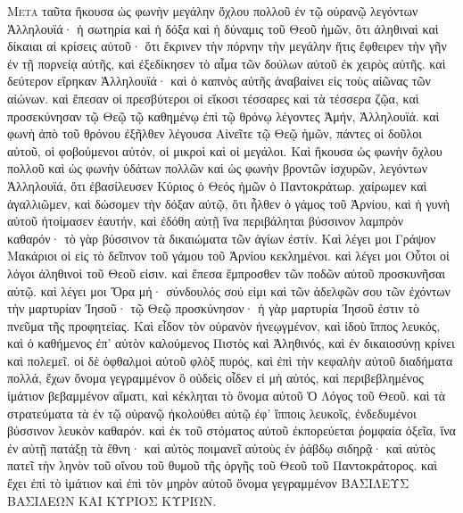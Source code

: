 \begin{pages}
    \begin{Rightside}
        \beginnumbering
		\renewcommand{\LettrineFontHook}{\PHtitl}
		\lettrine[lines=3]{Μ}{ετὰ} ταῦτα ἤκουσα ὡς φωνὴν μεγάλην ὄχλου πολλοῦ ἐν τῷ οὐρανῷ λεγόντων 	Ἁλληλουϊά· ἡ σωτηρία καὶ ἡ δόξα καὶ ἡ δύναμις τοῦ Θεοῦ ἡμῶν, ὅτι ἀληθιναὶ καὶ δίκαιαι αἱ κρίσεις αὐτοῦ· ὅτι ἔκρινεν τὴν πόρνην τὴν μεγάλην ἥτις ἔφθειρεν τὴν γῆν ἐν τῇ πορνείᾳ αὐτῆς, καὶ ἐξεδίκησεν τὸ αἷμα τῶν δούλων αὐτοῦ ἐκ χειρὸς αὐτῆς.
		\pend
		\pstart
		καὶ δεύτερον εἴρηκαν Ἁλληλουϊά· καὶ ὁ καπνὸς αὐτῆς ἀναβαίνει εἰς τοὺς αἰῶνας τῶν αἰώνων. καὶ ἔπεσαν οἱ πρεσβύτεροι οἱ εἴκοσι τέσσαρες καὶ τὰ τέσσερα ζῷα, καὶ προσεκύνησαν τῷ Θεῷ τῷ καθημένῳ ἐπὶ τῷ θρόνῳ λέγοντες Ἀμήν, Ἁλληλουϊά. καὶ φωνὴ ἀπὸ τοῦ θρόνου ἐξῆλθεν λέγουσα 	Αἰνεῖτε τῷ Θεῷ ἡμῶν, πάντες οἱ δοῦλοι αὐτοῦ, οἱ φοβούμενοι αὐτόν, οἱ μικροὶ καὶ οἱ μεγάλοι.
		\pend
		\pstart
		Καὶ ἤκουσα ὡς φωνὴν ὄχλου πολλοῦ καὶ ὡς φωνὴν ὑδάτων πολλῶν καὶ ὡς φωνὴν βροντῶν ἰσχυρῶν, λεγόντων Ἁλληλουϊά, ὅτι ἐβασίλευσεν Κύριος ὁ Θεός ἡμῶν ὁ Παντοκράτωρ. χαίρωμεν καὶ ἀγαλλιῶμεν, καὶ δώσομεν τὴν δόξαν αὐτῷ, ὅτι ἦλθεν ὁ γάμος τοῦ Ἀρνίου, καὶ ἡ γυνὴ 	αὐτοῦ ἡτοίμασεν ἑαυτήν, καὶ ἐδόθη αὐτῇ ἵνα περιβάληται βύσσινον λαμπρὸν καθαρόν· τὸ 	γὰρ βύσσινον τὰ δικαιώματα τῶν ἁγίων ἐστίν.
		\pend
		\pstart
		Καὶ λέγει μοι Γράψον Μακάριοι οἱ εἰς τὸ δεῖπνον τοῦ γάμου τοῦ Ἀρνίου κεκλημένοι. καὶ λέγει μοι Οὗτοι οἱ λόγοι ἀληθινοὶ τοῦ Θεοῦ εἰσιν. καὶ ἔπεσα ἔμπροσθεν τῶν ποδῶν αὐτοῦ προσκυνῆσαι αὐτῷ. καὶ λέγει μοι Ὅρα μή· σύνδουλός σού εἰμι καὶ τῶν ἀδελφῶν σου τῶν ἐχόντων τὴν μαρτυρίαν Ἰησοῦ· τῷ Θεῷ προσκύνησον· ἡ γὰρ μαρτυρία Ἰησοῦ ἐστιν τὸ πνεῦμα τῆς προφητείας. 
		\pend
		\pstart
		Καὶ εἶδον τὸν οὐρανὸν ἠνεῳγμένον, καὶ ἰδοὺ ἵππος λευκός, καὶ ὁ καθήμενος ἐπ’ αὐτὸν καλούμενος Πιστὸς καὶ Ἀληθινός, καὶ ἐν δικαιοσύνῃ κρίνει καὶ πολεμεῖ. οἱ δὲ ὀφθαλμοὶ αὐτοῦ φλὸξ πυρός, καὶ ἐπὶ τὴν κεφαλὴν αὐτοῦ διαδήματα πολλά, ἔχων ὄνομα γεγραμμένον ὃ οὐδεὶς οἶδεν εἰ μὴ αὐτός, καὶ περιβεβλημένος ἱμάτιον βεβαμμένον αἵματι, καὶ κέκληται τὸ ὄνομα αὐτοῦ Ὁ Λόγος τοῦ Θεοῦ. καὶ τὰ στρατεύματα τὰ ἐν τῷ οὐρανῷ ἠκολούθει αὐτῷ ἐφ’ ἵπποις λευκοῖς, ἐνδεδυμένοι βύσσινον λευκὸν καθαρόν. καὶ ἐκ τοῦ στόματος αὐτοῦ ἐκπορεύεται ῥομφαία ὀξεῖα, ἵνα ἐν αὐτῇ πατάξῃ τὰ ἔθνη· καὶ αὐτὸς ποιμανεῖ αὐτοὺς ἐν ῥάβδῳ σιδηρᾷ· καὶ αὐτὸς πατεῖ τὴν ληνὸν τοῦ οἴνου τοῦ θυμοῦ τῆς ὀργῆς τοῦ Θεοῦ τοῦ Παντοκράτορος. καὶ ἔχει ἐπὶ τὸ ἱμάτιον καὶ ἐπὶ τὸν μηρὸν αὐτοῦ ὄνομα γεγραμμένον ΒΑΣΙΛΕΥΣ ΒΑΣΙΛΕΩΝ ΚΑΙ ΚΥΡΙΟΣ ΚΥΡΙΩΝ. 

\end{Rightside}
\end{pages}
